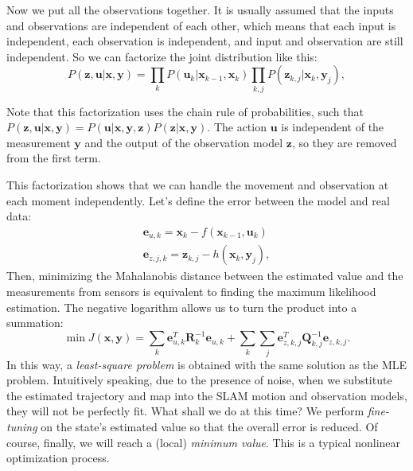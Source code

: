 Now we put all the observations together. It is usually assumed that the inputs and observations are independent of each other, which means that each input is independent, each observation is independent, and input and observation are still independent. So we can factorize the joint distribution like this:
\begin{equation}
	P\left( {\mathbf{z},\mathbf{u}|\mathbf{x},\mathbf{y}} \right) = \prod\limits_k {P\left( {{\mathbf{u}_k }|{\mathbf{x}_{k-1}},{\mathbf{x}_k}} \right)} \prod\limits_{k,j} {P\left( {{\mathbf{z} _{k,j}}|{\mathbf{x}_k},{\mathbf{y}_j}} \right)},
\end{equation}

Note that this factorization uses the chain rule of probabilities, such that $P(\mathbf{z},\mathbf{u} | \mathbf{x}, \mathbf{y}) = P(\mathbf{u} | \mathbf{x}, \mathbf{y},\mathbf{z}) P(\mathbf{z} | \mathbf{x}, \mathbf{y})$. The action $\mathbf{u}$ is independent of the measurement $\mathbf{y}$ and the output of the observation model $\mathbf{z}$, so they are removed from the first term.

This factorization shows that we can handle the movement and observation at each moment independently. Let's define the error between the model and real data: 
\begin{equation}
	\begin{array}{l}
		{\mathbf{e}_{u,k}} = {\mathbf{x}_k}-f\left( {{\mathbf{x}_{k-1}},{\mathbf{u}_k} } \right)\\
		{\mathbf{e}_{z,j,k}} = {\mathbf{z}_{k,j}}-h\left( {{\mathbf{x}_k},{\mathbf{y} _j}} \right),
	\end{array}
\end{equation}
Then, minimizing the Mahalanobis distance between the estimated value and the measurements from sensors is equivalent to finding the maximum likelihood estimation. The negative logarithm allows us to turn the product into a summation:
\begin{equation}
	\label{eq:least-square}
	\min J (\mathbf{x},\mathbf{y}) = \sum\limits_k {\mathbf{e}_{u,k}^T \mathbf{R}_k^{-1} {\mathbf{e}_{u,k}}} + \sum\limits_k {\sum\limits_j {\mathbf{e}_{z,k,j}^T \mathbf{Q}_ {k,j}^{-1}{\mathbf{e}_{z,k,j}}}}.
\end{equation}
In this way, a \textit{least-square problem} is obtained with the same solution as the MLE problem. Intuitively speaking, due to the presence of noise, when we substitute the estimated trajectory and map into the SLAM motion and observation models, they will not be perfectly fit. What shall we do at this time? We perform \textit{fine-tuning} on the state's estimated value so that the overall error is reduced. Of course, finally, we will reach a (local) \textit{minimum value}. This is a typical nonlinear optimization process.


